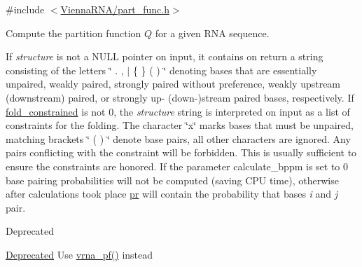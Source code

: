 {\ttfamily \#include $<$\hyperlink{part__func_8h}{Vienna\+R\+N\+A/part\+\_\+func.\+h}$>$}



Compute the partition function $Q$ for a given R\+N\+A sequence. 

If {\itshape structure} is not a N\+U\+L\+L pointer on input, it contains on return a string consisting of the letters \char`\"{} . , $\vert$ \{ \} ( ) \char`\"{} denoting bases that are essentially unpaired, weakly paired, strongly paired without preference, weakly upstream (downstream) paired, or strongly up-\/ (down-\/)stream paired bases, respectively. If \hyperlink{fold__vars_8h_a0afc287c2464866d94858c39175154af}{fold\+\_\+constrained} is not 0, the {\itshape structure} string is interpreted on input as a list of constraints for the folding. The character \char`\"{}x\char`\"{} marks bases that must be unpaired, matching brackets \char`\"{} ( ) \char`\"{} denote base pairs, all other characters are ignored. Any pairs conflicting with the constraint will be forbidden. This is usually sufficient to ensure the constraints are honored. If the parameter calculate\+\_\+bppm is set to 0 base pairing probabilities will not be computed (saving C\+P\+U time), otherwise after calculations took place \hyperlink{fold__vars_8h_ac98ec419070aee6831b44e5c700f090f}{pr} will contain the probability that bases {\itshape i} and {\itshape j} pair.

\begin{DoxyRefDesc}{Deprecated}
\item[\hyperlink{deprecated__deprecated000094}{Deprecated}]Use \hyperlink{group__pf__fold_ga29e256d688ad221b78d37f427e0e99bc}{vrna\+\_\+pf()} instead\end{DoxyRefDesc}


